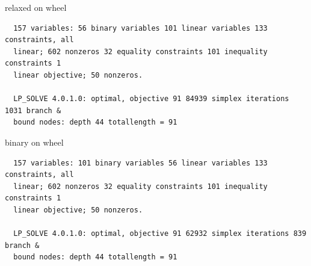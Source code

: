 \documentclass{article}
\begin{document}
relaxed on wheel
\begin{lstlisting}
  157 variables: 56 binary variables 101 linear variables 133 constraints, all
  linear; 602 nonzeros 32 equality constraints 101 inequality constraints 1
  linear objective; 50 nonzeros.

  LP_SOLVE 4.0.1.0: optimal, objective 91 84939 simplex iterations 1031 branch &
  bound nodes: depth 44 totallength = 91
\end{lstlisting}


binary on wheel

\begin{lstlisting}
  157 variables: 101 binary variables 56 linear variables 133 constraints, all
  linear; 602 nonzeros 32 equality constraints 101 inequality constraints 1
  linear objective; 50 nonzeros.

  LP_SOLVE 4.0.1.0: optimal, objective 91 62932 simplex iterations 839 branch &
  bound nodes: depth 44 totallength = 91
\end{lstlisting}
\end{document}
